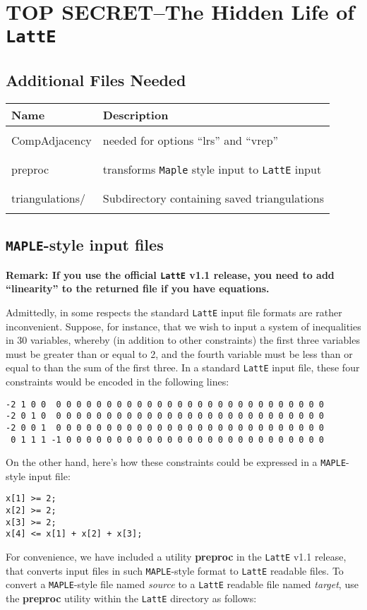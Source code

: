 \newpage

\section{TOP SECRET--The Hidden Life of {\tt LattE}}

\subsection{Additional Files Needed}
\begin{tabular}{|l|l|}
\hline
Name & Description\\
\hline 
& \\
CompAdjacency & needed for options ``lrs'' and ``vrep''\\
& \\
\hline
& \\
preproc & transforms {\tt Maple} style input to {\tt LattE} input\\
& \\
\hline
& \\
triangulations/ & Subdirectory containing saved triangulations\\
& \\
\hline
\end{tabular}


\subsection{{\tt MAPLE}-style input files}

{\bf Remark: If you use the official {\tt LattE} v1.1 release, you
  need to add ``linearity'' to the returned file if you have
  equations.}  

Admittedly, in some respects the standard {\tt LattE} input file
formats are rather inconvenient.
Suppose, for instance, that we wish to input a system of inequalities
in 30 variables, whereby (in addition to other constraints) the first
three variables must be greater than or equal to 2, and the fourth
variable must be less than or equal to than the sum of the first
three. In a standard {\tt LattE} input file, these four constraints
would be encoded in the following lines:
\begin{verbatim}
-2 1 0 0  0 0 0 0 0 0 0 0 0 0 0 0 0 0 0 0 0 0 0 0 0 0 0 0 0 0 0
-2 0 1 0  0 0 0 0 0 0 0 0 0 0 0 0 0 0 0 0 0 0 0 0 0 0 0 0 0 0 0
-2 0 0 1  0 0 0 0 0 0 0 0 0 0 0 0 0 0 0 0 0 0 0 0 0 0 0 0 0 0 0
 0 1 1 1 -1 0 0 0 0 0 0 0 0 0 0 0 0 0 0 0 0 0 0 0 0 0 0 0 0 0 0
\end{verbatim}
On the other hand, here's how these constraints could be expressed in
a {\tt MAPLE}-style input file:
\begin{verbatim}
x[1] >= 2;
x[2] >= 2;
x[3] >= 2;
x[4] <= x[1] + x[2] + x[3];
\end{verbatim}
For convenience, we have included a utility \textbf{preproc} in the
{\tt LattE} v1.1 release, that converts input files in such
{\tt MAPLE}-style format to {\tt LattE} readable files. To convert a
{\tt MAPLE}-style file named \textit{source} to a {\tt LattE} readable
file named \textit{target}, use the \textbf{preproc} utility within
the {\tt LattE} directory as follows:

